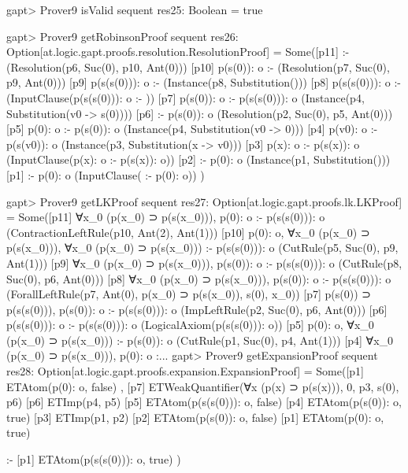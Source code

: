 \documentclass[a4paper,11pt]{article}
\begin{document}
\begin{clilisting}
gapt> Prover9 isValid sequent
res25: Boolean = true

gapt> Prover9 getRobinsonProof sequent
res26: Option[at.logic.gapt.proofs.resolution.ResolutionProof] =
Some([p11]  :-     (Resolution(p6, Suc(0), p10, Ant(0)))
[p10] p(s(0)): o :-     (Resolution(p7, Suc(0), p9, Ant(0)))
[p9] p(s(s(0))): o :-     (Instance(p8, Substitution()))
[p8] p(s(s(0))): o :-     (InputClause(p(s(s(0))): o :- ))
[p7] p(s(0)): o :- p(s(s(0))): o    (Instance(p4, Substitution(v0 -> s(0))))
[p6]  :- p(s(0)): o    (Resolution(p2, Suc(0), p5, Ant(0)))
[p5] p(0): o :- p(s(0)): o    (Instance(p4, Substitution(v0 -> 0)))
[p4] p(v0): o :- p(s(v0)): o    (Instance(p3, Substitution(x -> v0)))
[p3] p(x): o :- p(s(x)): o    (InputClause(p(x): o :- p(s(x)): o))
[p2]  :- p(0): o    (Instance(p1, Substitution()))
[p1]  :- p(0): o    (InputClause( :- p(0): o))
)

gapt> Prover9 getLKProof sequent
res27: Option[at.logic.gapt.proofs.lk.LKProof] =
Some([p11] ∀x_0 (p(x_0) ⊃ p(s(x_0))), p(0): o :- p(s(s(0))): o    (ContractionLeftRule(p10, Ant(2), Ant(1)))
[p10] p(0): o, ∀x_0 (p(x_0) ⊃ p(s(x_0))), ∀x_0 (p(x_0) ⊃ p(s(x_0))) :- p(s(s(0))): o    (CutRule(p5, Suc(0), p9, Ant(1)))
[p9] ∀x_0 (p(x_0) ⊃ p(s(x_0))), p(s(0)): o :- p(s(s(0))): o    (CutRule(p8, Suc(0), p6, Ant(0)))
[p8] ∀x_0 (p(x_0) ⊃ p(s(x_0))), p(s(0)): o :- p(s(s(0))): o    (ForallLeftRule(p7, Ant(0), p(x_0) ⊃ p(s(x_0)), s(0), x_0))
[p7] p(s(0)) ⊃ p(s(s(0))), p(s(0)): o :- p(s(s(0))): o    (ImpLeftRule(p2, Suc(0), p6, Ant(0)))
[p6] p(s(s(0))): o :- p(s(s(0))): o    (LogicalAxiom(p(s(s(0))): o))
[p5] p(0): o, ∀x_0 (p(x_0) ⊃ p(s(x_0))) :- p(s(0)): o    (CutRule(p1, Suc(0), p4, Ant(1)))
[p4] ∀x_0 (p(x_0) ⊃ p(s(x_0))), p(0): o :...
gapt> Prover9 getExpansionProof sequent
res28: Option[at.logic.gapt.proofs.expansion.ExpansionProof] =
Some([p1] ETAtom(p(0): o, false)
,
[p7] ETWeakQuantifier(∀x (p(x) ⊃ p(s(x))), 0, p3, s(0), p6)
[p6] ETImp(p4, p5)
[p5] ETAtom(p(s(s(0))): o, false)
[p4] ETAtom(p(s(0)): o, true)
[p3] ETImp(p1, p2)
[p2] ETAtom(p(s(0)): o, false)
[p1] ETAtom(p(0): o, true)

:-
[p1] ETAtom(p(s(s(0))): o, true)
)

\end{clilisting}
\end{document}
